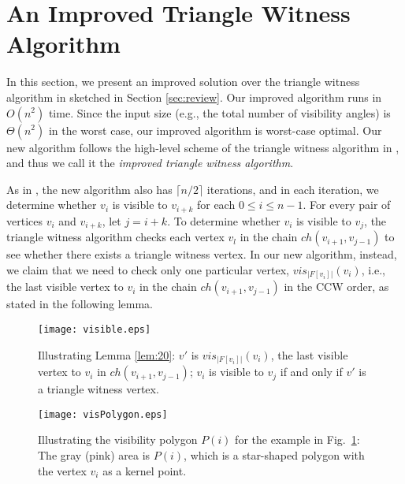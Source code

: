 \documentclass[11pt]{article}
\def\sectionspace{\vspace*{0in}}
\begin{document}
\sectionspace
\section{An Improved Triangle Witness Algorithm}
\label{sec:improve}

In this section, we present an improved solution over the triangle
witness algorithm in \cite{ref:DisserRe10} 
sketched in Section \ref{sec:review}. Our improved
algorithm runs in $O(n^2)$ time. Since the input size (e.g., the total
number of visibility angles) is $\Theta(n^2)$ in the worst case, our improved
algorithm is worst-case optimal. Our new algorithm follows the high-level 
scheme of the triangle witness algorithm in \cite{ref:DisserRe10}, and thus
we call it the {\em improved triangle witness algorithm}. 

As in \cite{ref:DisserRe10}, the new algorithm also has $\lceil n/2\rceil$
iterations, and in each iteration, we determine 
whether $v_i$ is visible to $v_{i+k}$ for each $0\leq i\leq n-1$.
For every pair of vertices $v_i$ and $v_{i+k}$, let $j=i+k$. To
determine whether $v_i$
is visible to $v_j$, the triangle witness algorithm \cite{ref:DisserRe10}
checks each vertex $v_l$ in the chain $ch(v_{i+1},v_{j-1})$ to 
see whether there exists a triangle witness vertex. 
In our new algorithm, instead, we claim that we 
need to check only one particular vertex, $vis_{|F[v_i]|}(v_i)$, i.e., the
last visible vertex to $v_i$ in the chain $ch(v_{i+1},v_{j-1})$ in the
CCW order, as stated in the following lemma. 


\begin{figure}[t]
\begin{minipage}[t]{\linewidth}
\begin{center}
\texttt{[image: visible.eps]}
\caption{\footnotesize Illustrating Lemma \ref{lem:20}: $v'$ is
$vis_{|F[v_i]|}(v_i)$, the
last visible vertex to $v_i$ in $ch(v_{i+1},v_{j-1})$; $v_i$ is
visible to $v_j$ if and only if $v'$ is a triangle witness vertex.
}\label{fig:visible}
\end{center}
\end{minipage}
\end{figure}

\begin{figure}[t]
\begin{minipage}[t]{\linewidth}
\begin{center}
\texttt{[image: visPolygon.eps]}
\caption{\footnotesize Illustrating the visibility polygon $P(i)$ 
for the example in Fig.~\ref{fig:visible}: The gray (pink) area is
$P(i)$, which is a star-shaped polygon with the vertex $v_i$ as a kernel point. 
}\label{fig:visPolygon}
\end{center}
\end{minipage}
\end{figure}
\end{document}
